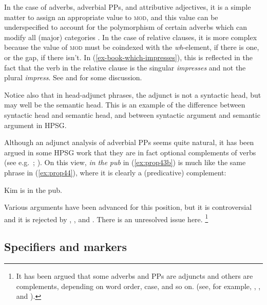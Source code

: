 \documentclass[output=paper,biblatex,babelshorthands,newtxmath,draftmode,colorlinks,citecolor=brown]{langscibook}
\begin{document}
In the case of adverbs, adverbial PPs, and attributive adjectives, it is a simple matter to assign
an appropriate value to \textsc{mod}, and this value can be underspecified to account for the
polymorphism of certain adverbs which can modify all (major) categories
\citep[--29]{AG2003b-u}. In the case of relative clauses, it is more complex because the value of
\textsc{mod} must be coindexed with the \emph{wh}-element, if there is one, or the gap, if there
isn’t. In (\ref{ex-book-which-impresses}), this is reflected in the fact that the verb in the
relative clause is the singular \emph{impresses} and not the plural \emph{impress}. See
 and  for some discussion. 

Notice also that in head-adjunct phrases, the adjunct is not a syntactic head, but may well be
the semantic head.
This is an example of the difference between syntactic head and semantic head, and between syntactic argument and semantic argument in HPSG.

Although an adjunct analysis of adverbial PPs seems quite natural, it has been argued in some HPSG work that they are in fact optional complements of verbs (see e.g.\ \citealp[4]{AG97a-u,BMS2001a}; \citealp[168, Footnote~2]{GSag2000a-u}). On this view, \emph{in the pub} in (\ref{ex:prop43b}) is much like the same phrase in (\ref{ex:prop44}), where it is clearly a (predicative) complement:

\ea\label{ex:prop44}
Kim is in the pub. 
\z

\noindent
Various arguments have been advanced for this position, but it is controversial and it is rejected by \citet{Levine2003a}, \citet[Chapter~3]{LH2006a}, and \citet{Chaves2009a}. There is an unresolved issue here.%
%
\footnote{It has been argued that some adverbs and PPs are adjuncts and others are complements,
  depending on word order, case, and so on. (see, for example, \citealp{Prze99},
  \citealp{HA2014a-u}, and ).
}
%

\subsection{Specifiers and markers}\label{sec:prop6.2}
\end{document}
